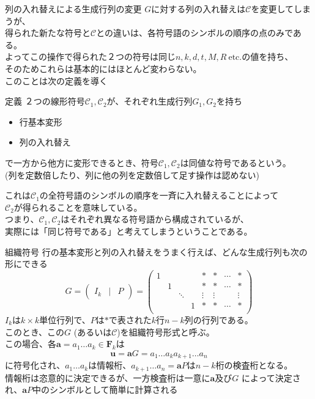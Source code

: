 \documentclass[dvipdfmx,10pt,jsarticle]{beamer}
\begin{document}
  \begin{frame}{列の入れ替えによる生成行列の変更}
    $G$に対する列の入れ替えは$\mathcal{C}$を変更してしまうが、 \\
    得られた新たな符号と$\mathcal{C}$との違いは、各符号語のシンボルの順序の点のみである。 \\
    よってこの操作で得られた２つの符号は同じ$n, k, d, t, M, R \ \text{etc.}$の値を持ち、 \\
    そのためこれらは基本的にはほとんど変わらない。 \\
    このことは次の定義を導く
    \begin{block}{定義}
    ２つの線形符号$\mathcal{C}_1, \mathcal{C}_2$が、それぞれ生成行列$G_1, G_2$を持ち
    \begin{itemize}
      \item 行基本変形
      \item 列の入れ替え
    \end{itemize}
    で一方から他方に変形できるとき、符号$\mathcal{C}_1, \mathcal{C}_2$は同値な符号であるという。 \\
    (列を定数倍したり、列に他の列を定数倍して足す操作は認めない)
    \end{block}

    これは$\mathcal{C}_1$の全符号語のシンボルの順序を一斉に入れ替えることによって \\
    $\mathcal{C}_2$が得られることを意味している。\\
    つまり、$\mathcal{C}_1, \mathcal{C}_2$はそれぞれ異なる符号語から構成されているが、\\ 
    実際には「同じ符号である」と考えてしまうということである。
  \end{frame}

  \begin{frame}{組織符号}
    行の基本変形と列の入れ替えをうまく行えば、どんな生成行列も次の形にできる
    \[ G = \begin{pmatrix}
        I_k & \mid & P
      \end{pmatrix} = \begin{pmatrix}
        1 &  &  &  & \ast & \ast & \cdots & \ast \\
          & 1 &  &  & \ast & \ast & \cdots & \ast \\
          &  & \ddots &  & \vdots & \vdots &  & \vdots \\
          &  &  & 1 & \ast & \ast & \cdots & \ast \\
      \end{pmatrix} \]
      $I_k$は$k \times k$単位行列で、$P$は$\ast$で表された$k$行$n-k$列の行列である。 \\
      このとき、この$G$ (あるいは$\mathcal{C}$)を組織符号形式と呼ぶ。  \\
      この場合、各$\mathbf{a} = a_1 \ldots a_k \in \mathbf{F}_k$は
      \[ \mathbf{u} = \mathbf{a} G = a_1 \ldots a_k a_{k+1} \ldots a_n \]
      に符号化され、$a_1 \ldots a_k$は情報桁、$a_{k+1} \ldots a_n = \mathbf{a} P$は$n - k$桁の検査桁となる。\\
    情報桁は恣意的に決定できるが、一方検査桁は一意に$\mathbf{a}$及び$G$
    によって決定され、$\mathbf{a} P$中のシンボルとして簡単に計算される
  \end{frame}
\end{document}
